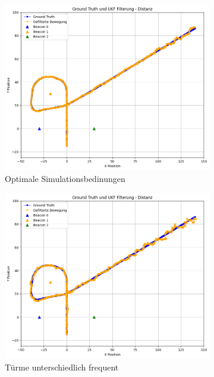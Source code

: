 \begin{figure}
    \begin{subfigure}{.333\textwidth}
        \centering
        \includegraphics[width=.9\linewidth]{Ergebnisse/plots_fahrten/distanz/distanz_const_vel_basic.png}  
        \caption{Optimale Simulationsbedinungen}
    \end{subfigure}    
    \begin{subfigure}{.333\textwidth}
        \centering
        \includegraphics[width=.9\linewidth]{Ergebnisse/plots_fahrten/distanz/distanz_const_vel_freq.png} 
        \caption{Türme unterschiedlich frequent}
    \end{subfigure}    
    \begin{subfigure}{.333\textwidth}
        \centering

\end{subfigure}
\end{figure}
